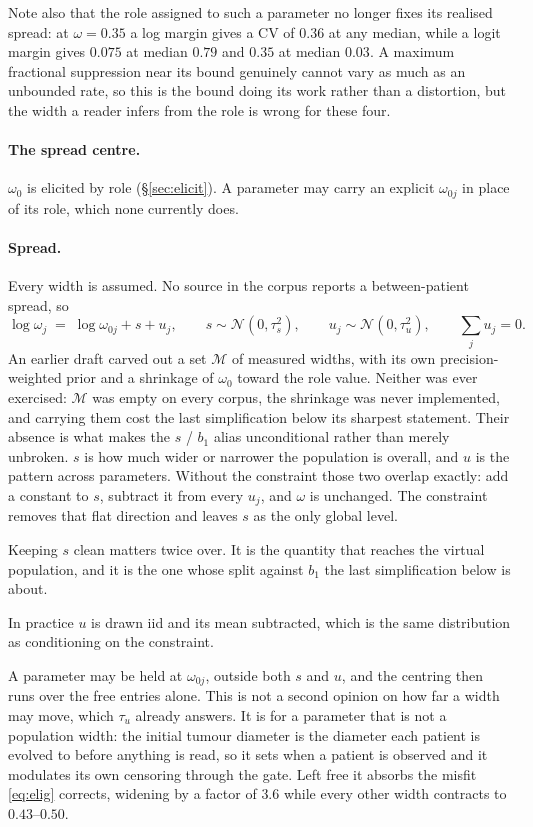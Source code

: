 \documentclass[11pt]{article}
\newcommand{\Ncal}{\mathcal{N}}
\newcommand{\Mset}{\mathcal{M}}
\begin{document}
Note also that the role assigned to such a parameter no longer fixes its realised
spread: at $\omega=0.35$ a log margin gives a CV of $0.36$ at any median, while a
logit margin gives $0.075$ at median $0.79$ and $0.35$ at median $0.03$. A
maximum fractional suppression near its bound genuinely cannot vary as much as an
unbounded rate, so this is the bound doing its work rather than a distortion, but
the width a reader infers from the role is wrong for these four.

\paragraph{The spread centre.} $\omega_0$ is elicited by role
(\S\ref{sec:elicit}). A parameter may carry an explicit $\omega_{0j}$ in place of
its role, which none currently does.

\paragraph{Spread.} Every width is assumed. No source in the corpus reports a
between-patient spread, so
\begin{equation}
\log\omega_j \;=\; \log\omega_{0j} + s + u_j,
\qquad
s\sim\Ncal(0,\tau_s^2),
\qquad
u_j\sim\Ncal(0,\tau_u^2),
\qquad
\sum_{j} u_j = 0 .
\label{eq:omegaassumed}
\end{equation}
An earlier draft carved out a set $\Mset$ of measured widths, with its own
precision-weighted prior and a shrinkage of $\omega_0$ toward the role value.
Neither was ever exercised: $\Mset$ was empty on every corpus, the shrinkage was
never implemented, and carrying them cost the last simplification below its
sharpest statement. Their absence is what makes the $s$ / $b_1$ alias
unconditional rather than merely unbroken.
$s$ is how much wider or narrower the population is overall, and $u$ is the
pattern across parameters. Without the constraint those two overlap exactly: add
a constant to $s$, subtract it from every $u_j$, and $\omega$ is unchanged. The
constraint removes that flat direction and leaves $s$ as the only global level.

Keeping $s$ clean matters twice over. It is the quantity that reaches the virtual
population, and it is the one whose split against $b_1$ the last simplification
below is about.

In practice $u$ is drawn iid and its mean subtracted, which is the same
distribution as conditioning on the constraint.

A parameter may be held at $\omega_{0j}$, outside both $s$ and $u$, and the
centring then runs over the free entries alone. This is not a second opinion on
how far a width may move, which $\tau_u$ already answers. It is for a parameter
that is not a population width: the initial tumour diameter is the diameter each
patient is evolved to before anything is read, so it sets when a patient is
observed and it modulates its own censoring through the gate. Left free it
absorbs the misfit \eqref{eq:elig} corrects, widening by a factor of $3.6$ while
every other width contracts to $0.43$--$0.50$.
\end{document}
